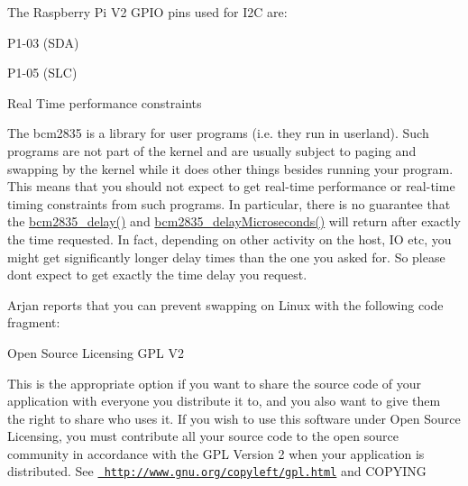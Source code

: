 The Raspberry Pi V2 GPIO pins used for I2C are\+:


\begin{DoxyItemize}
\item P1-\/03 (SDA)
\item P1-\/05 (SLC)
\end{DoxyItemize}

\begin{DoxyParagraph}{Real Time performance constraints}

\end{DoxyParagraph}
The bcm2835 is a library for user programs (i.\+e. they run in \textquotesingle{}userland\textquotesingle{}). Such programs are not part of the kernel and are usually subject to paging and swapping by the kernel while it does other things besides running your program. This means that you should not expect to get real-\/time performance or real-\/time timing constraints from such programs. In particular, there is no guarantee that the \mbox{\hyperlink{group__gpio_ga3ffbe079732a995cfacd691f677d9789}{bcm2835\+\_\+delay()}} and \mbox{\hyperlink{group__gpio_gade50bd6947463a242783accf91e5b5e4}{bcm2835\+\_\+delay\+Microseconds()}} will return after exactly the time requested. In fact, depending on other activity on the host, IO etc, you might get significantly longer delay times than the one you asked for. So please dont expect to get exactly the time delay you request.

Arjan reports that you can prevent swapping on Linux with the following code fragment\+:


\begin{DoxyCode}{0}

\end{DoxyCode}


\begin{DoxyParagraph}{Open Source Licensing GPL V2}

\end{DoxyParagraph}
This is the appropriate option if you want to share the source code of your application with everyone you distribute it to, and you also want to give them the right to share who uses it. If you wish to use this software under Open Source Licensing, you must contribute all your source code to the open source community in accordance with the GPL Version 2 when your application is distributed. See \href{http://www.gnu.org/copyleft/gpl.html}{\texttt{ http\+://www.\+gnu.\+org/copyleft/gpl.\+html}} and COPYING

